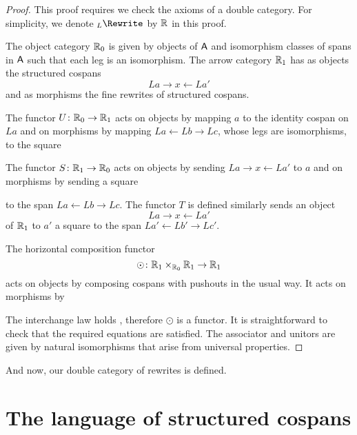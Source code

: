 \documentclass{amsart}
\begin{document}
\begin{proof}
  This proof requires we check the axioms of a double
  category. For simplicity, we denote $_L\Rewrite$ by
  $\mathbb{R} $ in this proof.

  The object category $\mathbb{R}_0$ is given by objects of $\mathsf{A}$
  and isomorphism classes of spans in $\mathsf{A}$ such that each
  leg is an isomorphism.  The arrow category $\mathbb{R}_1$ has as
  objects the structured cospans
  \[
    La \to x \gets La'
  \]
  and as morphisms the fine rewrites of structured cospans.
	
  The functor $U \colon \mathbb{R}_0 \to \mathbb{R}_1$ acts on objects by
  mapping $a$ to the identity cospan on $La$ and on
  morphisms by mapping $La \gets Lb \to Lc$, whose legs are
  isomorphisms, to the square
  
  
  The functor $S \colon \mathbb{R}_1 \to \mathbb{R}_0$ acts on objects by
  sending $La \to x \gets La'$ to $a$ and on morphisms by
  sending a square 
  
  to the span $ La \gets Lb \to Lc $. The functor $T$ is
  defined similarly sends an object \[ La \to x \gets La' \]
  of $ \mathbb{R}_1 $ to $ a' $ a square
   to the span
  $ La' \gets Lb' \to Lc' $.
  
  The horizontal composition functor
  \[
    \odot \colon \mathbb{R}_1 \times_{\mathbb{R}_0} \mathbb{R}_1 \to
    \mathbb{R}_1
  \]
  acts on objects by composing cospans with pushouts in the
  usual way.  It acts on morphisms by
  

  The interchange law holds
  \cite[Lem.~4.3]{CicCour_SpCspTopos}, therefore $\odot$ is
  a functor. It is straightforward to check that the
  required equations are satisfied.  The associator and
  unitors are given by natural isomorphisms that arise from
  universal properties.
\end{proof}

And now, our double category of rewrites is defined.

\section{The language of structured cospans}
\label{sec:structural-induction}

\end{document}
